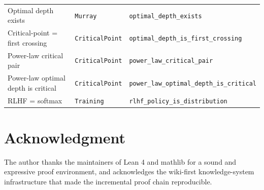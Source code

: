 \documentclass[journal]{IEEEtran}
\begin{document}
\begin{table}[!t]
\begin{tabular}{@{}lll@{}}
Optimal depth exists & \texttt{Murray} & \texttt{optimal\_depth\_exists} \\
Critical-point = first crossing & \texttt{CriticalPoint} & \texttt{optimal\_depth\_is\_first\_crossing} \\
Power-law critical pair & \texttt{CriticalPoint} & \texttt{power\_law\_critical\_pair} \\
Power-law optimal depth is critical & \texttt{CriticalPoint} & \texttt{power\_law\_optimal\_depth\_is\_critical} \\
RLHF = softmax & \texttt{Training} & \texttt{rlhf\_policy\_is\_distribution} \\
\bottomrule
\end{tabular}
\end{table}

\section*{Acknowledgment}
The author thanks the maintainers of Lean 4 and mathlib for a sound and
expressive proof environment, and acknowledges the wiki-first knowledge-system
infrastructure that made the incremental proof chain reproducible.
\end{document}

